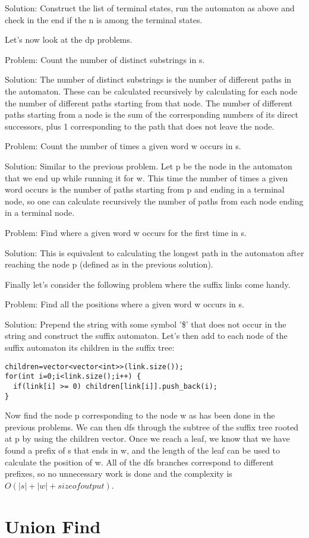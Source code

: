 \documentclass[a4paper,13pt]{article}
\newcommand\includefile[3]{
   \section{#1}
   \begin{multicols}{2}
    
   \end{multicols}
}
\begin{document}
Solution: Construct the list of terminal states, run the automaton as above and check in the end if the n is among the terminal states.

Let's now look at the dp problems.

Problem: Count the number of distinct substrings in s.

Solution: The number of distinct substrings is the number of different paths in the automaton. These can be calculated recursively by calculating for each node the number of different paths starting from that node. The number of different paths starting from a node is the sum of the corresponding numbers of its direct successors, plus 1 corresponding to the path that does not leave the node.

Problem: Count the number of times a given word w occurs in s.

Solution: Similar to the previous problem. Let p be the node in the automaton that we end up while running it for w. This time the number of times a given word occurs is the number of paths starting from p and ending in a terminal node, so one can calculate recursively the number of paths from each node ending in a terminal node.

Problem: Find where a given word w occurs for the first time in s.

Solution: This is equivalent to calculating the longest path in the automaton after reaching the node p (defined as in the previous solution).

Finally let's consider the following problem where the suffix links come handy.

Problem: Find all the positions where a given word w occurs in s.

Solution: Prepend the string with some symbol '\$' that does not occur in the string and construct the suffix automaton. Let's then add to each node of the suffix automaton its children in the suffix tree:

\begin{verbatim}
children=vector<vector<int>>(link.size());
for(int i=0;i<link.size();i++) {
  if(link[i] >= 0) children[link[i]].push_back(i);
}
\end{verbatim}

Now find the node p corresponding to the node w as has been done in the previous problems. We can then dfs through the subtree of the suffix tree rooted at p by using the children vector. Once we reach a leaf, we know that we have found a prefix of s that ends in w, and the length of the leaf can be used to calculate the position of w. All of the dfs branches correspond to different prefixes, so no unnecessary work is done and the complexity is $O(|s| + |w| + size of output)$.

\includefile{Union Find}{../lib}{union_find.cpp}
\end{document}
